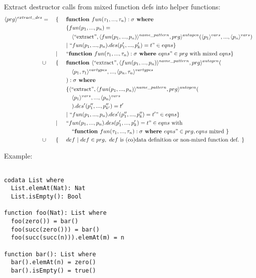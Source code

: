 \documentclass[11pt]{article} %
\begin{document}
Extract destructor calls from mixed function defs into helper functions:
\begin{alignat*}{3}
\langle prg \rangle^{extract\_des} & = ~&&\{ ~&& \textrm{\textbf{function }} fun(\tau_1, ..., \tau_n):\sigma \textrm{\textbf{ where }} \\
& && && \{ fun(p_1, ..., p_n) = \\
& && &&\quad \langle `` \textrm{extract} ", \langle fun(p_1, ..., p_n) \rangle^{name\_pattern}, prg \rangle^{autogen}(\langle p_1 \rangle^{vars}, ..., \langle p_n \rangle^{vars}) \\
& && && | ~ `` fun(p_1, ..., p_n).des(p'_1, ..., p'_k) = t " \in eqns \} \\
& && | && `` \textrm{\textbf{function }} fun(\tau_1, ..., \tau_n): \sigma \textrm{\textbf{ where }} eqns " \in prg \textrm{ with mixed } eqns \} \\
&\cup && \{ && \textrm{\textbf{function }} \langle `` \textrm{extract} ", \langle fun(p_1, ..., p_n) \rangle^{name\_pattern}, prg \rangle^{autogen} (\\
& && &&\quad \langle p_1, \tau_1 \rangle^{vartypes}, ..., \langle p_n, \tau_n \rangle^{vartypes} \\
& && &&): \sigma \textrm{\textbf{ where }} \\
& && && \{ \langle `` \textrm{extract} ", \langle fun(p_1, ..., p_n) \rangle^{name\_pattern}, prg \rangle^{autogen}(\\
& && &&\quad \langle p_1 \rangle^{vars}, ..., \langle p_n \rangle^{vars} \\
& && &&\quad ).des'(p''_1, ..., p''_{k'}) = t' \\
& && && | ~ `` fun(p_1, ..., p_n).des'(p''_1, ..., p''_k) = t' " \in eqns \} \\
& && | && `` fun(p_1, ..., p_n).des(p'_1, ..., p'_k) = t " \in eqns \textrm{ with } \\
& && &&\quad `` \textrm{\textbf{function }} fun(\tau_1, ..., \tau_n): \sigma \textrm{\textbf{ where }} eqns" \in prg, eqns \textrm{ mixed } \} \\
&\cup && \{ && def ~ | ~ def \in prg, ~ def \textrm{ is (co)data definition or non-mixed function def. } \}
\end{alignat*}

Example:

\begin{lstlisting}  

codata List where
  List.elemAt(Nat): Nat
  List.isEmpty(): Bool

function foo(Nat): List where
  foo(zero()) = bar()
  foo(succ(zero())) = bar()
  foo(succ(succ(n))).elemAt(m) = n

function bar(): List where
  bar().elemAt(n) = zero()
  bar().isEmpty() = true()

\end{lstlisting}
\end{document}
